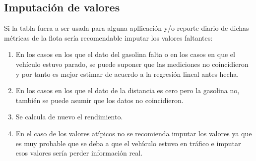 \documentclass[]{article}
\newenvironment{Shaded}{\begin{snugshade}}{\end{snugshade}}
\newcommand{\KeywordTok}[1]{\textcolor[rgb]{0.13,0.29,0.53}{\textbf{#1}}}
\newcommand{\DecValTok}[1]{\textcolor[rgb]{0.00,0.00,0.81}{#1}}
\newcommand{\StringTok}[1]{\textcolor[rgb]{0.31,0.60,0.02}{#1}}
\newcommand{\CommentTok}[1]{\textcolor[rgb]{0.56,0.35,0.01}{\textit{#1}}}
\newcommand{\OperatorTok}[1]{\textcolor[rgb]{0.81,0.36,0.00}{\textbf{#1}}}
\newcommand{\NormalTok}[1]{#1}
\begin{document}
\subsection{Imputación de valores}\label{imputacion-de-valores}

Si la tabla fuera a ser usada para alguna apllicación y/o reporte diario
de dichas métricas de la flota sería recomendable imputar los valores
faltantes:

\begin{enumerate}
\def\labelenumi{\arabic{enumi}.}
\item
  En los casos en los que el dato del gasolina falta o en los casos en
  que el vehículo estuvo parado, se puede suponer que las mediciones no
  coincidieron y por tanto es mejor estimar de acuerdo a la regresión
  lineal antes hecha.
\item
  En los casos en los que el dato de la distancia es cero pero la
  gasolina no, también se puede asumir que los datos no coincidieron.
\item
  Se calcula de nuevo el rendimiento.
\item
  En el caso de los valores atípicos no se recomienda imputar los
  valores ya que es muy probable que se deba a que el vehículo estuvo en
  tráfico e imputar esos valores sería perder información real.
\end{enumerate}

\begin{Shaded}
\end{Shaded}
\end{document}
